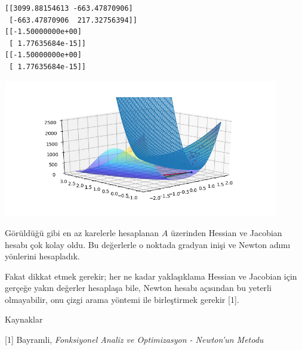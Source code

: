 \documentclass[12pt,fleqn]{article}\usepackage{../../common}
\begin{document}
\begin{verbatim}
[[3099.88154613 -663.47870906]
 [-663.47870906  217.32756394]]
[[-1.50000000e+00]
 [ 1.77635684e-15]]
[[-1.50000000e+00]
 [ 1.77635684e-15]]
\end{verbatim}

\includegraphics[height=6cm]{func_70_dfo_02.png}

Görüldüğü gibi en az karelerle hesaplanan $A$ üzerinden Hessian ve Jacobian
hesabı çok kolay oldu. Bu değerlerle o noktada gradyan inişi ve Newton
adımı yönlerini hesapladık. 

Fakat dikkat etmek gerekir; her ne kadar yaklaşıklama Hessian ve Jacobian
için gerçeğe yakın değerler hesaplaşa bile, Newton hesabı açısından bu
yeterli olmayabilir, onu çizgi arama yöntemi ile birleştirmek gerekir [1].

Kaynaklar

[1] Bayramli, {\em Fonksiyonel Analiz ve Optimizasyon - Newton'un Metodu}
\end{document}

